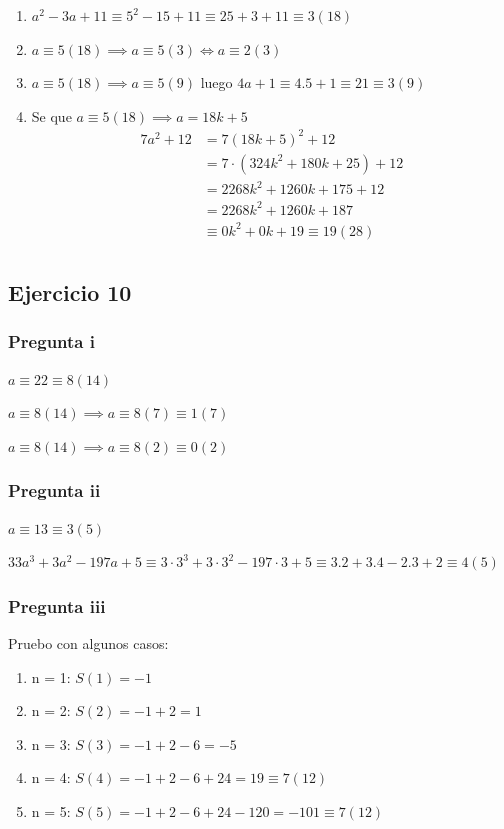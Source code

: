 \begin{enumerate}
    \item $ a^2 - 3a + 11 \equiv 5^2 - 15 + 11 \equiv 25 + 3 + 11 \equiv 3(18) $
    \item $ a\equiv 5(18) \implies a \equiv 5(3) \iff a\equiv 2(3) $
    \item $ a\equiv 5(18) \implies a \equiv 5(9) $ luego $ 4a+1 \equiv 4.5 + 1 \equiv 21 \equiv 3(9) $
    \item Se que $ a \equiv 5(18) \implies a = 18k + 5$
    \begin{align*}
        7a^2 + 12 &= 7(18k + 5)^2 + 12 \\
        &= 7\cdot (324k^2 + 180k+ 25) + 12 \\
        &= 2268k^2 + 1260k+ 175 + 12 \\
        &= 2268k^2 + 1260k+ 187 \\
        &\equiv 0k^2 + 0k+ 19 \equiv 19(28) \\
    \end{align*}
\end{enumerate}

\subsection{Ejercicio 10}
\subsubsection{Pregunta i}
$ a\equiv 22 \equiv 8(14)$

$ a\equiv 8(14) \implies a \equiv 8(7) \equiv 1(7)$

$ a\equiv 8(14) \implies a \equiv 8(2) \equiv 0(2)$

\subsubsection{Pregunta ii}
$ a \equiv 13 \equiv 3(5) $

$ 33a^3 + 3a^2 - 197a +5 \equiv 3 \cdot 3^3 + 3 \cdot 3^2 - 197 \cdot 3 + 5 \equiv 3.2 + 3.4 -2.3 + 2 \equiv 4(5) $

\subsubsection{Pregunta iii}
Pruebo con algunos casos:
\begin{enumerate}
    \item n = 1: $ S(1) = -1 $ 
    \item n = 2: $ S(2) = -1 + 2 = 1 $ 
    \item n = 3: $ S(3) = -1 + 2 -6 = -5 $ 
    \item n = 4: $ S(4) = -1 + 2 -6 + 24 = 19 \equiv 7(12) $ 
    \item n = 5: $ S(5) = -1 + 2 -6 + 24 -120 = -101 \equiv 7(12) $ 
\end{enumerate}

